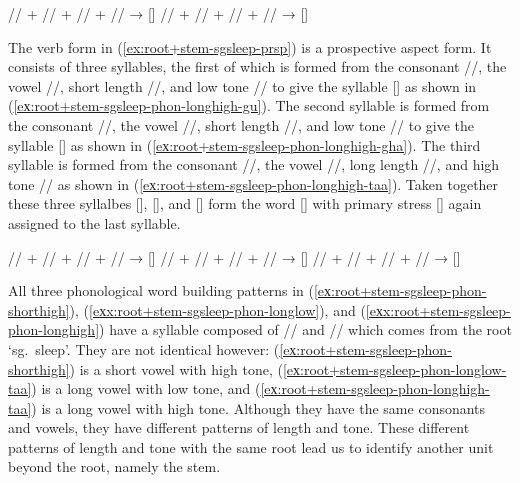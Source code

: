 \pex\label{eхx:root+stem-sgsleep-phon-longlow}%
\a\label{eх:root+stem-sgsleep-phon-longlow-woo}%
%
	// + // + // + //
	→ []
\a\label{eх:root+stem-sgsleep-phon-longlow-taa}%
%
	// + // + // + //
	→ []
\xe

The verb form in (\ref{ex:root+stem-sgsleep-prsp}) is a prospective aspect form. It consists of three syllables, the first of which is formed from the consonant //, the vowel //, short length //, and low tone // to give the syllable [] as shown in (\ref{eх:root+stem-sgsleep-phon-longhigh-gu}). The second syllable is formed from the consonant //, the vowel //, short length //, and low tone // to give the syllable [] as shown in (\ref{eх:root+stem-sgsleep-phon-longhigh-gha}). The third syllable is formed from the consonant //, the vowel //, long length //, and high tone // as shown in (\ref{eх:root+stem-sgsleep-phon-longhigh-taa}). Taken together these three syllalbes [], [], and [] form the word [] with primary stress [] again assigned to the last syllable.

\pex\label{eхx:root+stem-sgsleep-phon-longhigh}%
\a\label{eх:root+stem-sgsleep-phon-longhigh-gu}%
%
	// + // + // + //
	→ []
\a\label{eх:root+stem-sgsleep-phon-longhigh-gha}%
%
	// + // + // + //
	→ []
\a\label{eх:root+stem-sgsleep-phon-longhigh-taa}%
%
	// + // + // + //
	→ []
\xe

All three phonological word building patterns in (\ref{eх:root+stem-sgsleep-phon-shorthigh}), (\ref{eхx:root+stem-sgsleep-phon-longlow}), and (\ref{eхx:root+stem-sgsleep-phon-longhigh}) have a syllable composed of // and // which comes from the root  ‘sg.\ sleep’. They are not identical however: (\ref{eх:root+stem-sgsleep-phon-shorthigh}) is a short vowel with high tone, (\ref{eх:root+stem-sgsleep-phon-longlow-taa}) is a long vowel with low tone, and (\ref{eх:root+stem-sgsleep-phon-longhigh-taa}) is a long vowel with high tone. Although they have the same consonants and vowels, they have different patterns of length and tone. These different patterns of length and tone with the same root lead us to identify another unit beyond the root, namely the stem.

